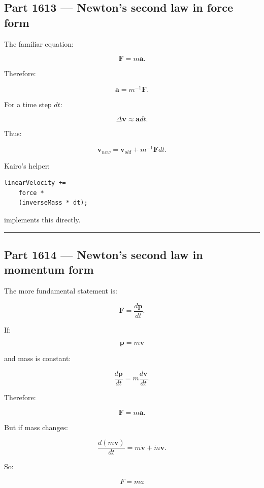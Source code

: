 \subsection{Part 1613 --- Newton's second law in force form}\label{06-engine-ii-ch034-part-1613-newtons-second-law-in-force-form}

The familiar equation:

\[
\boxed{
\mathbf{F}=m\mathbf{a}.
}
\]

Therefore:

\[
\mathbf{a}
=
m^{-1}\mathbf{F}.
\]

For a time step \(dt\):

\[
\Delta\mathbf{v}
\approx
\mathbf{a}dt.
\]

Thus:

\[
\boxed{
\mathbf{v}_{new}
=
\mathbf{v}_{old}
+
m^{-1}\mathbf{F}dt.
}
\]

Kairo's helper:

\begin{verbatim}
linearVelocity +=
    force *
    (inverseMass * dt);
\end{verbatim}

implements this directly.

\begin{center}\rule{0.5\linewidth}{0.5pt}\end{center}

\subsection{Part 1614 --- Newton's second law in momentum form}\label{06-engine-ii-ch034-part-1614-newtons-second-law-in-momentum-form}

The more fundamental statement is:

\[
\boxed{
\mathbf{F}
=
\frac{d\mathbf{p}}{dt}.
}
\]

If:

\[
\mathbf{p}=m\mathbf{v}
\]

and mass is constant:

\[
\frac{d\mathbf{p}}{dt}
=
m\frac{d\mathbf{v}}{dt}.
\]

Therefore:

\[
\mathbf{F}
=
m\mathbf{a}.
\]

But if mass changes:

\[
\frac{d(m\mathbf{v})}{dt}
=
m\dot{\mathbf{v}}
+
\dot m\mathbf{v}.
\]

So:

\[
F=ma
\]

